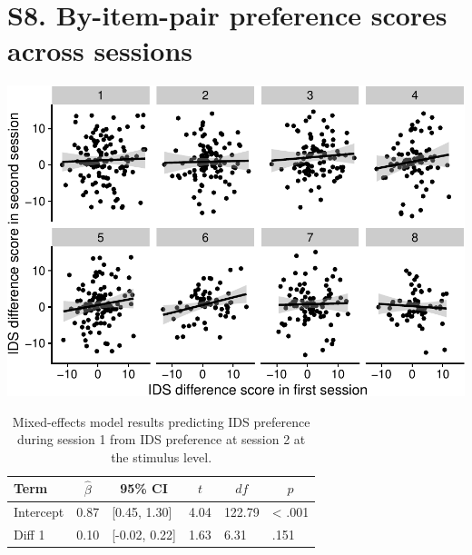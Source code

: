 \documentclass[
  man, donotrepeattitle,floatsintext]{apa6}
\begin{document}
\hypertarget{s8.-by-item-pair-preference-scores-across-sessions}{%
\section{S8. By-item-pair preference scores across sessions}\label{s8.-by-item-pair-preference-scores-across-sessions}}

\includegraphics{MB1T_supplement_files/figure-latex/unnamed-chunk-13-1.pdf}

\begin{table}[tbp]

\begin{center}
\begin{threeparttable}

\caption{\label{tab:unnamed-chunk-13}Mixed-effects model results predicting IDS preference during session 1 from IDS preference at session 2 at the stimulus level.}

\begin{tabular}{llllll}
\toprule
Term & \multicolumn{1}{c}{$\hat{\beta}$} & \multicolumn{1}{c}{95\% CI} & \multicolumn{1}{c}{$t$} & \multicolumn{1}{c}{$\mathit{df}$} & \multicolumn{1}{c}{$p$}\\
\midrule
Intercept & 0.87 & {}[0.45, 1.30] & 4.04 & 122.79 & < .001\\
Diff 1 & 0.10 & {}[-0.02, 0.22] & 1.63 & 6.31 & .151\\
\bottomrule
\end{tabular}

\end{threeparttable}
\end{center}

\end{table}
\end{document}
